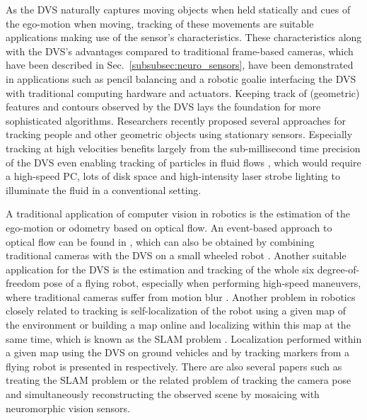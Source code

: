 As the \ac{DVS} naturally captures moving objects when held statically and cues of the ego-motion when moving, tracking of these movements are suitable applications making use of the sensor's characteristics.
These characteristics along with the \ac{DVS}'s advantages compared to traditional frame-based cameras, which have been described in Sec.~\ref{subsubsec:neuro_sensors}, have been demonstrated in applications such as pencil balancing \parencite{Conradt2009} and a robotic goalie \parencite{Delbruck2013} interfacing the \ac{DVS} with traditional computing hardware and actuators.
Keeping track of (geometric) features \parencite{Lagorce2015} and contours \parencite{Barranco2014} observed by the \ac{DVS} lays the foundation for more sophisticated algorithms.
Researchers recently proposed several approaches for tracking people \parencite{Schraml2010, Piatkowska2012} and other geometric objects \parencite{ReverterValeiras2016} using stationary sensors.
Especially tracking at high velocities \parencite{Saner2014} benefits largely from the sub-millisecond time precision of the \ac{DVS} even enabling tracking of particles in fluid flows \parencite{Drazen2011}, which would require a high-speed PC, lots of disk space and high-intensity laser strobe lighting to illuminate the fluid in a conventional setting.

A traditional application of computer vision in robotics is the estimation of the ego-motion or odometry based on optical flow.
An event-based approach to optical flow can be found in \textcite{Benosman2014}, which can also be obtained by combining traditional cameras with the \ac{DVS} on a small wheeled robot \parencite{Censi2014}.
Another suitable application for the \ac{DVS} is the estimation and tracking of the whole six degree-of-freedom pose of a flying robot, especially when performing high-speed maneuvers, where traditional cameras suffer from motion blur \parencite{Mueggler2014}.
Another problem in robotics closely related to tracking is self-localization of the robot using a given map of the environment or building a map online and localizing within this map at the same time, which is known as the \ac{SLAM} problem \parencite{Thrun2005}.
Localization performed within a given map using the \ac{DVS} on ground vehicles and by tracking markers from a flying robot is presented in \textcites{Gallego2015}{Censi2013} respectively.
There are also several papers such as \textcites{Weikersdorfer2012}{Weikersdorfer2014} treating the \ac{SLAM} problem or the related problem of tracking the camera pose and simultaneously reconstructing the observed scene by mosaicing \parencite{Kim2014} with neuromorphic vision sensors.


